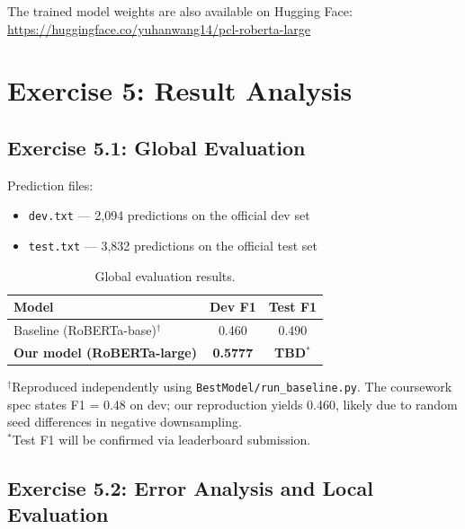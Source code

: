\documentclass[11pt,a4paper]{article}
\begin{document}
The trained model weights are also available on Hugging Face:
\url{https://huggingface.co/yuhanwang14/pcl-roberta-large}


\newpage
\section{Exercise 5: Result Analysis}
\label{sec:ex5}

\subsection{Exercise 5.1: Global Evaluation}

Prediction files:
\begin{itemize}
    \item \texttt{dev.txt} — 2,094 predictions on the official dev set
    \item \texttt{test.txt} — 3,832 predictions on the official test set
\end{itemize}

\begin{table}[H]
\centering
\caption{Global evaluation results.}
\label{tab:global}
\begin{tabular}{lcc}
\toprule
\textbf{Model} & \textbf{Dev F1} & \textbf{Test F1} \\
\midrule
Baseline (RoBERTa-base)$^\dagger$ & 0.460 & 0.490 \\
\textbf{Our model (RoBERTa-large)} & \textbf{0.5777} & \textbf{TBD}$^*$ \\
\bottomrule
\end{tabular}

\medskip
{\footnotesize $^\dagger$Reproduced independently using \texttt{BestModel/run\_baseline.py}. The coursework spec states F1 = 0.48 on dev; our reproduction yields 0.460, likely due to random seed differences in negative downsampling.\\
$^*$Test F1 will be confirmed via leaderboard submission.}
\end{table}

\subsection{Exercise 5.2: Error Analysis and Local Evaluation}
\end{document}
